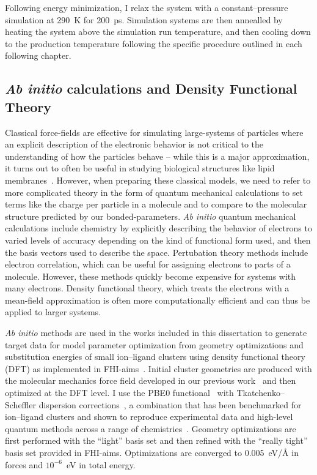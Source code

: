 Following energy minimization, I relax the system with a constant--pressure
simulation at 290~K for 200~ps. Simulation systems are then annealled by heating the system above the
simulation run temperature, and then cooling down to the production temperature following the
specific procedure outlined in each following chapter.

\subsection{\emph{Ab initio} calculations and Density Functional Theory}
Classical force-fields are effective for simulating large-systems of particles where an explicit description of 
the electronic behavior is not critical to the understanding of how the particles behave -- while this is a major 
approximation, it turns out to often be useful in studying biological structures like lipid membranes~\cite{berkowitz:2019}.
However, when preparing these classical models, we need to refer to more complicated theory in the form 
of quantum mechanical calculations to set terms like the 
charge per particle in a molecule and to compare to the molecular structure predicted by our bonded-parameters.
\emph{Ab initio} quantum mechanical calculations include chemistry by explicitly describing the behavior of electrons to varied 
levels of accuracy depending on the kind of functional form used, and then the basis vectors used to describe the space.
Pertubation theory methods include electron correlation, which can be useful for assigning electrons to parts of a molecule. 
However, these methods quickly become expensive for systems with many electrons. Density functional theory, which treats the electrons 
with a mean-field approximation is often more computationally efficient and can thus be applied to larger systems.

\emph{Ab initio} methods are used in the works included in this dissertation to generate target data for 
model parameter optimization from geometry
optimizations and substitution energies of small ion–ligand clusters
using density functional theory (DFT) as implemented in
FHI-aims~\cite{fhiaims}. Initial cluster geometries are produced with
the molecular mechanics force field developed in our previous
work~\cite{kruczek:2017,saunders:2019} and then optimized at the DFT
level. I use the PBE0 functional~\cite{perdew:1996:generalized,adamo:1999:toward}
with Tkatchenko–Scheffler dispersion corrections~\cite{tkatchenko:2009},
a combination that has been benchmarked for ion–ligand clusters and shown
to reproduce experimental data and high-level quantum methods across a
range of chemistries~\cite{wineman:2019,wineman:2020:transferable,wineman:2020:improved}.
Geometry optimizations are first performed with the ``light'' basis set
and then refined with the ``really tight'' basis set provided in
FHI-aims. Optimizations are converged to 0.005~eV/\AA{} in forces and
$10^{-6}$~eV in total energy.  


